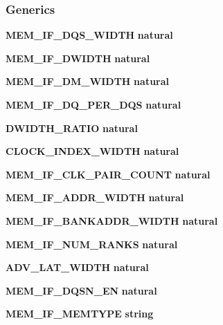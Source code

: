 \subsubsection*{Generics}
 \begin{DoxyCompactItemize}
\item 
{\bf M\+E\+M\+\_\+\+I\+F\+\_\+\+D\+Q\+S\+\_\+\+W\+I\+D\+TH} {\bfseries {\bfseries \textcolor{comment}{natural}\textcolor{vhdlchar}{ }}}
\item 
{\bf M\+E\+M\+\_\+\+I\+F\+\_\+\+D\+W\+I\+D\+TH} {\bfseries {\bfseries \textcolor{comment}{natural}\textcolor{vhdlchar}{ }}}
\item 
{\bf M\+E\+M\+\_\+\+I\+F\+\_\+\+D\+M\+\_\+\+W\+I\+D\+TH} {\bfseries {\bfseries \textcolor{comment}{natural}\textcolor{vhdlchar}{ }}}
\item 
{\bf M\+E\+M\+\_\+\+I\+F\+\_\+\+D\+Q\+\_\+\+P\+E\+R\+\_\+\+D\+QS} {\bfseries {\bfseries \textcolor{comment}{natural}\textcolor{vhdlchar}{ }}}
\item 
{\bf D\+W\+I\+D\+T\+H\+\_\+\+R\+A\+T\+IO} {\bfseries {\bfseries \textcolor{comment}{natural}\textcolor{vhdlchar}{ }}}
\item 
{\bf C\+L\+O\+C\+K\+\_\+\+I\+N\+D\+E\+X\+\_\+\+W\+I\+D\+TH} {\bfseries {\bfseries \textcolor{comment}{natural}\textcolor{vhdlchar}{ }}}
\item 
{\bf M\+E\+M\+\_\+\+I\+F\+\_\+\+C\+L\+K\+\_\+\+P\+A\+I\+R\+\_\+\+C\+O\+U\+NT} {\bfseries {\bfseries \textcolor{comment}{natural}\textcolor{vhdlchar}{ }}}
\item 
{\bf M\+E\+M\+\_\+\+I\+F\+\_\+\+A\+D\+D\+R\+\_\+\+W\+I\+D\+TH} {\bfseries {\bfseries \textcolor{comment}{natural}\textcolor{vhdlchar}{ }}}
\item 
{\bf M\+E\+M\+\_\+\+I\+F\+\_\+\+B\+A\+N\+K\+A\+D\+D\+R\+\_\+\+W\+I\+D\+TH} {\bfseries {\bfseries \textcolor{comment}{natural}\textcolor{vhdlchar}{ }}}
\item 
{\bf M\+E\+M\+\_\+\+I\+F\+\_\+\+N\+U\+M\+\_\+\+R\+A\+N\+KS} {\bfseries {\bfseries \textcolor{comment}{natural}\textcolor{vhdlchar}{ }}}
\item 
{\bf A\+D\+V\+\_\+\+L\+A\+T\+\_\+\+W\+I\+D\+TH} {\bfseries {\bfseries \textcolor{comment}{natural}\textcolor{vhdlchar}{ }}}
\item 
{\bf M\+E\+M\+\_\+\+I\+F\+\_\+\+D\+Q\+S\+N\+\_\+\+EN} {\bfseries {\bfseries \textcolor{comment}{natural}\textcolor{vhdlchar}{ }}}
\item 
{\bf M\+E\+M\+\_\+\+I\+F\+\_\+\+M\+E\+M\+T\+Y\+PE} {\bfseries {\bfseries \textcolor{comment}{string}\textcolor{vhdlchar}{ }}}

\end{DoxyCompactItemize}
